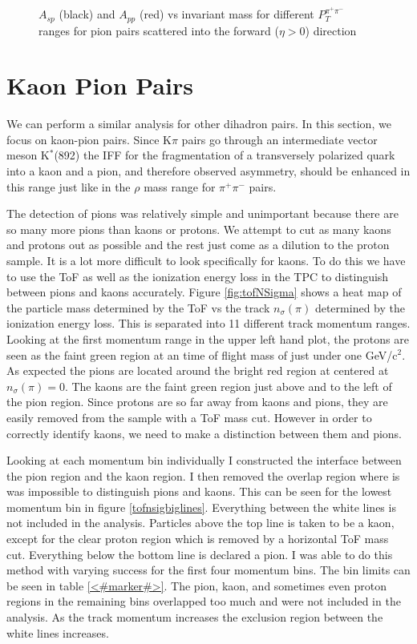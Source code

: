 \documentclass[abstract = on,listof=totoc, bibliography=totoc]{scrreprt}
\newcommand{\ptpair}{P_{T}^{\pi^+\pi^-}}
\newcommand{\pip}{\pi^+}
\newcommand{\pim}{\pi^-}
\newcommand{\pair}{$\pip\pim$ }
\newcommand{\nsigpi}{n_\sigma(\pi)}
\begin{document}
\begin{figure}
\begin{tabular}{cc}
\end{tabular}
\caption{$A_{sp}$ (black) and $A_{pp}$ (red) vs invariant mass for different $\ptpair$ ranges for pion pairs scattered into the forward ($\eta > 0$) direction}
\label{fig:partWaveFits}
\end{figure}






\section{Kaon Pion Pairs}

We can perform a similar analysis for other dihadron pairs. In this section, we focus on kaon-pion pairs. Since K$\pi$ pairs go through an intermediate vector meson K$^*$(892) the IFF for the fragmentation of a transversely polarized quark into a kaon and a pion, and therefore observed asymmetry, should be enhanced in this range just like in the $\rho$ mass range for \pair pairs\cite{PhysRevLett.80.1166}. 

The detection of pions was relatively simple and unimportant because there are so many more pions than kaons or protons. We attempt to cut as many kaons and protons out as possible and the rest just come as a dilution to the proton sample. It is a lot more difficult to look specifically for kaons. To do this we have to use the ToF as well as the ionization energy loss in the TPC to distinguish between pions and kaons accurately. Figure \ref{fig:tofNSigma} shows a heat map of the particle mass determined by the ToF vs the track $\nsigpi$ determined by the ionization energy loss. This is separated into 11 different track momentum ranges. Looking at the first momentum range in the upper left hand plot, the protons are seen as the faint green region at an time of flight mass of just under one GeV/c$^2$. As expected the pions are located around the bright red region at centered at $\nsigpi = 0$. The kaons are the faint green region just above and to the left of the pion region. Since protons are so far away from kaons and pions, they are easily removed from the sample with a ToF mass cut. However in order to correctly identify kaons, we need to make a distinction between them and pions. 

Looking at each momentum bin individually I constructed the interface between the pion region and the kaon region. I then removed the overlap region where is was impossible to distinguish pions and kaons. This can be seen for the lowest momentum bin in figure \ref{tofnsigbiglines}. Everything between the white lines is not included in the analysis. Particles above the top line is taken to be a kaon, except for the clear proton region which is removed by a horizontal ToF mass cut. Everything below the bottom line is declared a pion. I was able to do this method with varying success for the first four momentum bins. The bin limits can be seen in table \ref{<#marker#>}. The pion, kaon, and sometimes even proton regions in the remaining bins overlapped too much and were not included in the analysis. As the track momentum increases the exclusion region between the white lines increases.    
\end{document}

